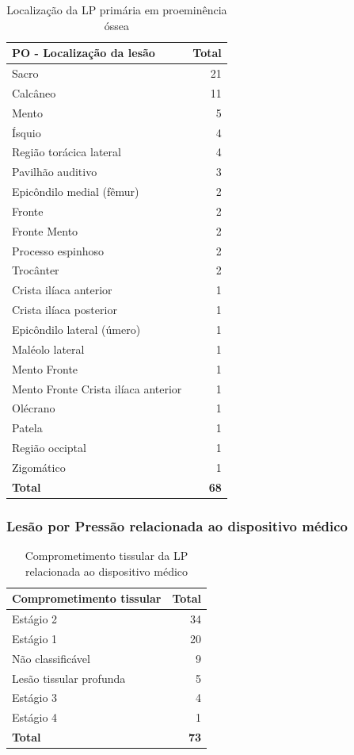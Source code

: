 \documentclass[
  a4paper]{article}
\begin{document}
\begin{table}[H]

\caption{\label{tab:unnamed-chunk-17}Localização da LP primária em proeminência óssea}
\centering
\begin{tabular}[t]{lr}
\toprule
PO - Localização da lesão & Total\\
\midrule
Sacro & 21\\
Calcâneo & 11\\
Mento & 5\\
Ísquio & 4\\
Região torácica lateral & 4\\
\addlinespace
Pavilhão auditivo & 3\\
Epicôndilo medial (fêmur) & 2\\
Fronte & 2\\
Fronte
Mento & 2\\
Processo espinhoso & 2\\
\addlinespace
Trocânter & 2\\
Crista ilíaca anterior & \vphantom{1} 1\\
Crista ilíaca posterior & 1\\
Epicôndilo lateral (úmero) & 1\\
Maléolo lateral & 1\\
\addlinespace
Mento
Fronte & 1\\
Mento
Fronte
Crista ilíaca anterior & 1\\
Olécrano & 1\\
Patela & 1\\
Região occiptal & 1\\
\addlinespace
Zigomático & 1\\
\midrule
\textbf{Total} & \textbf{68}\\
\bottomrule
\end{tabular}
\end{table}

\subsubsection{Lesão por Pressão relacionada ao dispositivo médico}

\begin{table}[H]

\caption{\label{tab:unnamed-chunk-18}Comprometimento tissular da LP relacionada ao dispositivo médico}
\centering
\begin{tabular}[t]{lr}
\toprule
Comprometimento tissular & Total\\
\midrule
Estágio 2 & 34\\
Estágio 1 & 20\\
Não classificável & 9\\
Lesão tissular profunda & 5\\
Estágio 3 & 4\\
\addlinespace
Estágio 4 & 1\\
\midrule
\textbf{Total} & \textbf{73}\\
\bottomrule
\end{tabular}
\end{table}
\end{document}

